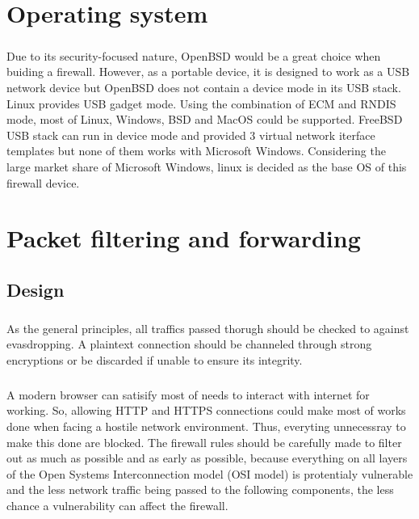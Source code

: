 \documentclass[mscthesis]{usiinfthesis}
\begin{document}
\chapter{Operating system}

\paragraph{}
Due to its security-focused nature, OpenBSD would be a great choice when buiding a firewall. However, as a portable device, it is designed to work as a USB network device but OpenBSD does not contain a device mode in its USB stack. Linux provides USB gadget mode. Using the combination of ECM and RNDIS mode, most of Linux, Windows, BSD and MacOS could be supported. FreeBSD USB stack can run in device mode and provided 3 virtual network iterface templates but none of them works with Microsoft Windows\citep{freebsdhb:usb}. Considering the large market share of Microsoft Windows, linux is decided as the base OS of this firewall device.

\chapter{Packet filtering and forwarding}
\section{Design}
\paragraph{}
As the general principles, all traffics passed thorugh should be checked to against evasdropping. A plaintext connection should be channeled through strong encryptions or be discarded if unable to ensure its integrity.
\paragraph{}
A modern browser can satisify most of needs to interact with internet for working. So, allowing HTTP and HTTPS connections could make most of works done when facing a hostile network environment. Thus, everyting unnecessray to make this done are blocked. The firewall rules should be carefully made to filter out as much as possible and as early as possible, because everything on all layers of the Open Systems Interconnection model (OSI model) is protentialy vulnerable and the less network traffic being passed to the following components, the less chance a vulnerability can affect the firewall.
\end{document}

